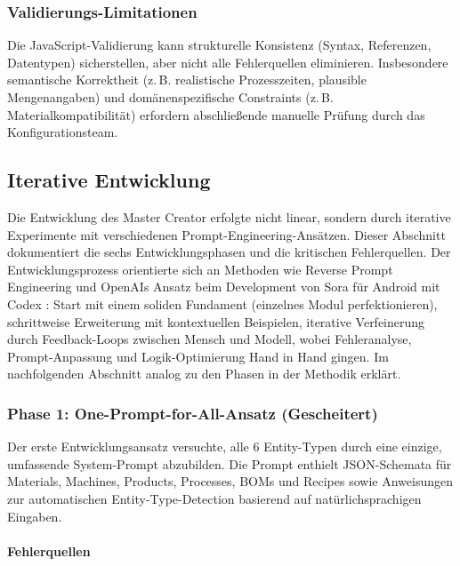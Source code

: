 \subsubsection{Validierungs-Limitationen}

Die JavaScript-Validierung kann strukturelle Konsistenz (Syntax, Referenzen, Datentypen) sicherstellen, aber nicht alle Fehlerquellen eliminieren. Insbesondere semantische Korrektheit (z.\,B. realistische Prozesszeiten, plausible Mengenangaben) und domänenspezifische Constraints (z.\,B. Materialkompatibilität) erfordern abschließende manuelle Prüfung durch das Konfigurationsteam.

\subsection{Iterative Entwicklung}
\label{sec:IterativeEntwicklung}

Die Entwicklung des Master Creator erfolgte nicht linear, sondern durch iterative Experimente mit verschiedenen Prompt-Engineering-Ansätzen. Dieser Abschnitt dokumentiert die sechs Entwicklungsphasen und die kritischen Fehlerquellen. Der Entwicklungsprozess orientierte sich an Methoden wie Reverse Prompt Engineering \citep{li2025reversepromptengineering} und OpenAIs Ansatz beim Development von Sora für Android mit Codex \citep{openai:sora_android2025}: Start mit einem soliden Fundament (einzelnes Modul perfektionieren), schrittweise Erweiterung mit kontextuellen Beispielen, iterative Verfeinerung durch Feedback-Loops zwischen Mensch und Modell, wobei Fehleranalyse, Prompt-Anpassung und Logik-Optimierung Hand in Hand gingen. Im nachfolgenden Abschnitt analog zu den Phasen in der Methodik erklärt.

\subsubsection{Phase 1: One-Prompt-for-All-Ansatz (Gescheitert)}

Der erste Entwicklungsansatz versuchte, alle 6 Entity-Typen durch eine einzige, umfassende System-Prompt abzubilden. Die Prompt enthielt JSON-Schemata für Materials, Machines, Products, Processes, BOMs und Recipes sowie Anweisungen zur automatischen Entity-Type-Detection basierend auf natürlichsprachigen Eingaben.

\paragraph{Fehlerquellen}

